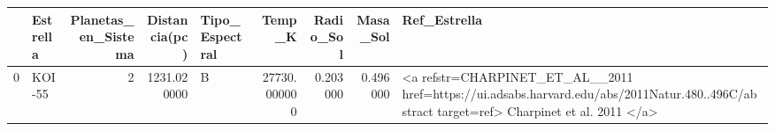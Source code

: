 \begin{tabular}{llrrlrrrl}
\toprule
 & Estrella & Planetas_en_Sistema & Distancia(pc) & Tipo_Espectral & Temp_K & Radio_Sol & Masa_Sol & Ref_Estrella \\
\midrule
0 & KOI-55 & 2 & 1231.020000 & B & 27730.000000 & 0.203000 & 0.496000 & <a refstr=CHARPINET_ET_AL__2011 href=https://ui.adsabs.harvard.edu/abs/2011Natur.480..496C/abstract target=ref> Charpinet et al. 2011 </a> \\
\bottomrule
\end{tabular}
